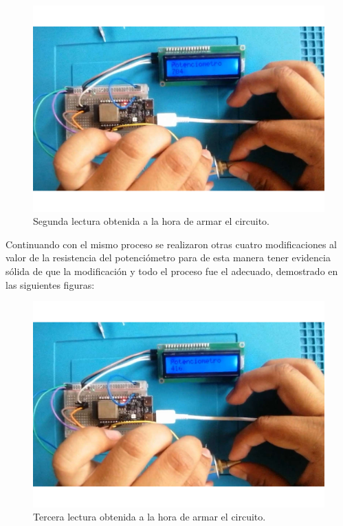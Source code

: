                     \begin{figure}[H]
        \centering
        \includegraphics[trim = {45mm 15mm 80mm 20mm},clip,scale=0.5]{19/Img/evidenciaCambio2.pdf}
        \caption{Segunda lectura obtenida a la hora de armar el circuito.}
        \label{fig:evidenciaCambio2}
    \end{figure}
    Continuando con el mismo proceso se realizaron otras cuatro modificaciones al valor de la resistencia del potenciómetro para de esta manera tener evidencia sólida de que la modificación y todo el proceso fue el adecuado, demostrado en las siguientes figuras:
    \newpage
    \begin{figure}[H]
        \centering
        \includegraphics[trim = {45mm 15mm 80mm 20mm},clip,scale=0.5]{19/Img/evidenciaCambio3.pdf}
        \caption{Tercera lectura obtenida a la hora de armar el circuito.}
        \label{fig:evidenciaCambio3}
    \end{figure}
